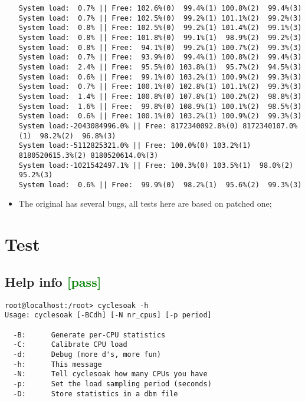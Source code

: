 \documentclass[a4paper]{report}
\begin{document}
\begin{itemize}
\begin{lstlisting}
System load:  0.7% || Free: 102.6%(0)  99.4%(1) 100.8%(2)  99.4%(3)
System load:  0.7% || Free: 102.5%(0)  99.2%(1) 101.1%(2)  99.2%(3)
System load:  0.8% || Free: 102.5%(0)  99.2%(1) 101.4%(2)  99.1%(3)
System load:  0.8% || Free: 101.8%(0)  99.1%(1)  98.9%(2)  99.2%(3)
System load:  0.8% || Free:  94.1%(0)  99.2%(1) 100.7%(2)  99.3%(3)
System load:  0.7% || Free:  93.9%(0)  99.4%(1) 100.8%(2)  99.4%(3)
System load:  2.4% || Free:  95.5%(0) 103.8%(1)  95.7%(2)  94.5%(3)
System load:  0.6% || Free:  99.1%(0) 103.2%(1) 100.9%(2)  99.3%(3)
System load:  0.7% || Free: 100.1%(0) 102.8%(1) 101.1%(2)  99.3%(3)
System load:  1.4% || Free: 100.8%(0) 107.8%(1) 100.2%(2)  98.8%(3)
System load:  1.6% || Free:  99.8%(0) 108.9%(1) 100.1%(2)  98.5%(3)
System load:  0.6% || Free: 100.1%(0) 103.2%(1) 100.9%(2)  99.3%(3)
System load:-2043084996.0% || Free: 8172340092.8%(0) 8172340107.0%(1)  98.2%(2)  96.8%(3)
System load:-5112825321.0% || Free: 100.0%(0) 103.2%(1) 8180520615.3%(2) 8180520614.0%(3)
System load:-1021542497.1% || Free: 100.3%(0) 103.5%(1)  98.0%(2)  95.2%(3)
System load:  0.6% || Free:  99.9%(0)  98.2%(1)  95.6%(2)  99.3%(3)
\end{lstlisting}
    \item The original has several bugs, all tests here are based on patched one;
\end{itemize}
\section{Test}
\subsection{Help info \textcolor{green}{[pass]}}
\begin{lstlisting}
root@localhost:/root> cyclesoak -h
Usage: cyclesoak [-BCdh] [-N nr_cpus] [-p period]

  -B:      Generate per-CPU statistics
  -C:      Calibrate CPU load
  -d:      Debug (more d's, more fun)
  -h:      This message
  -N:      Tell cyclesoak how many CPUs you have
  -p:      Set the load sampling period (seconds)
  -D:      Store statistics in a dbm file
\end{lstlisting}\null\\
\end{document}
